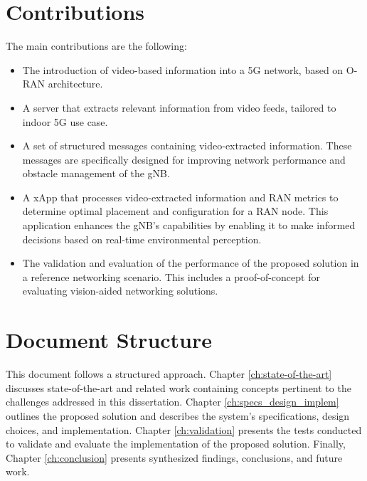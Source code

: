 \section{Contributions}

The main contributions are the following:

    \begin{itemize}
    
    \item The introduction of video-based information into a 5G network, based on O-RAN architecture.
    
    \item A server that extracts relevant information from video feeds, tailored to indoor 5G use case. 
    
    \item A set of structured messages containing video-extracted information. These messages are specifically designed for improving network performance and obstacle management of the gNB.
    
    \item A xApp that processes video-extracted information and RAN metrics to determine optimal placement and configuration for a RAN node. This application enhances the gNB's capabilities by enabling it to make informed decisions based on real-time environmental perception.
    
    \item The validation and evaluation of the performance of the proposed solution in a reference networking scenario. This includes a proof-of-concept for evaluating vision-aided networking solutions.
    
    \end{itemize}


\section{Document Structure}

This document follows a structured approach. Chapter \ref{ch:state-of-the-art} discusses state-of-the-art and related work containing concepts pertinent to the challenges addressed in this dissertation. Chapter \ref{ch:specs_design_implem} outlines the proposed solution and describes the system's specifications, design choices, and implementation. Chapter \ref{ch:validation} presents the tests conducted to validate and evaluate the implementation of the proposed solution. Finally, Chapter \ref{ch:conclusion} presents synthesized findings, conclusions, and future work.